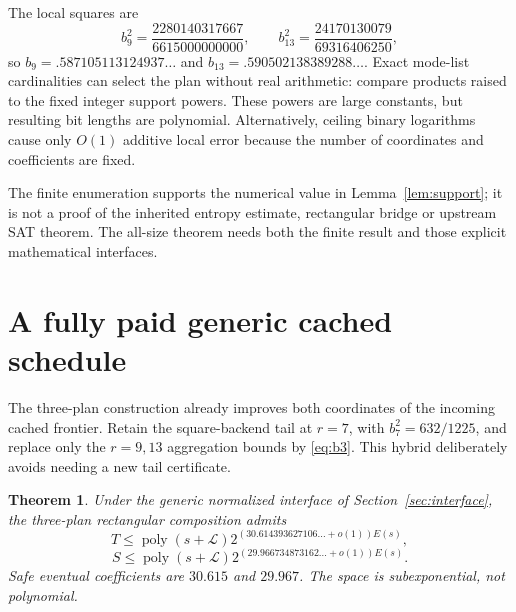 \documentclass[11pt,letterpaper]{article}
\newtheorem{theorem}{Theorem}[section]\newtheorem{lemma}[theorem]{Lemma}\newtheorem{proposition}[theorem]{Proposition}\newtheorem{corollary}[theorem]{Corollary}
\theoremstyle{remark}\newtheorem{remark}[theorem]{Remark}
\newcommand{\poly}{\operatorname{poly}}\newcommand{\vTwo}{v_2}\newcommand{\ceil}[1]{\left\lceil#1\right\rceil}\newcommand{\floor}[1]{\left\lfloor#1\right\rfloor}\newcommand{\LL}{\mathcal L}
\begin{document}
The local squares are
\begin{equation}\label{eq:b3}
 b_9^2=\frac{2280140317667}{6615000000000},\qquad
 b_{13}^2=\frac{24170130079}{69316406250},
\end{equation}
so $b_9=.587105113124937\ldots$ and $b_{13}=.590502138389288\ldots$. Exact mode-list cardinalities can select the plan without real arithmetic: compare products raised to the fixed integer support powers. These powers are large constants, but resulting bit lengths are polynomial. Alternatively, ceiling binary logarithms cause only $O(1)$ additive local error because the number of coordinates and coefficients are fixed.

The finite enumeration supports the numerical value in Lemma~\ref{lem:support}; it is not a proof of the inherited entropy estimate, rectangular bridge or upstream SAT theorem. The all-size theorem needs both the finite result and those explicit mathematical interfaces.

\section{A fully paid generic cached schedule}
\label{sec:cached}
The three-plan construction already improves both coordinates of the incoming cached frontier. Retain the square-backend tail at $r=7$, with $b_7^2=632/1225$, and replace only the $r=9,13$ aggregation bounds by \eqref{eq:b3}. This hybrid deliberately avoids needing a new tail certificate.

\begin{theorem}\label{thm:threecached}
Under the generic normalized interface of Section~\ref{sec:interface}, the three-plan rectangular composition admits
\[
 T\le\poly(s+\LL)2^{(30.614393627106\ldots+o(1))E(s)},
\]
\[
 S\le\poly(s+\LL)2^{(29.966734873162\ldots+o(1))E(s)}.
\]
Safe eventual coefficients are $30.615$ and $29.967$. The space is subexponential, not polynomial.
\end{theorem}
\end{document}
